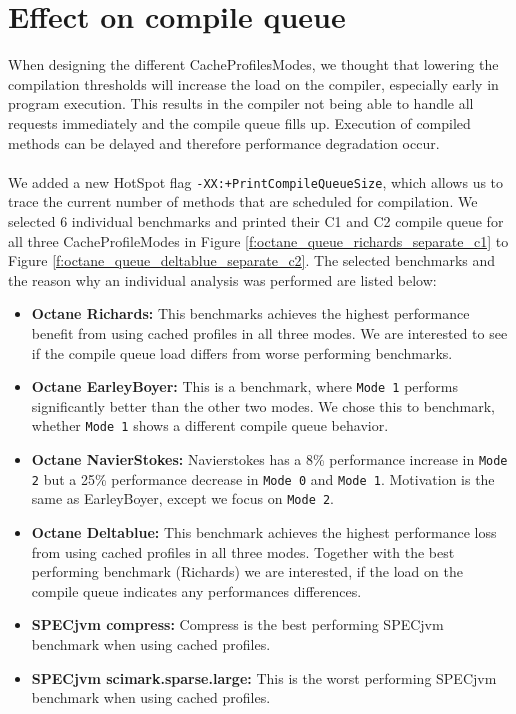 \section{Effect on compile queue}
\label{s:perf_compilequeue}
When designing the different CacheProfilesModes, we thought that lowering the compilation thresholds will increase the load on the compiler, especially early in program execution. This results in the compiler not being able to handle all requests immediately and the compile queue fills up. Execution of compiled methods can be delayed and therefore performance degradation occur.
\\\\
We added a new HotSpot flag \texttt{-XX:+PrintCompileQueueSize}, which allows us to trace the current number of methods that are scheduled for compilation. We selected 6 individual benchmarks and printed their C1 and C2 compile queue for all three CacheProfileModes in Figure \ref{f:octane_queue_richards_separate_c1} to Figure \ref{f:octane_queue_deltablue_separate_c2}.
The selected benchmarks and the reason why an individual analysis was performed are listed below:
\begin{itemize}
  \item \textbf{Octane Richards:} This benchmarks achieves the highest performance benefit from using cached profiles in all three modes. We are interested to see if the compile queue load differs from worse performing benchmarks.
  \item \textbf{Octane EarleyBoyer:} This is a benchmark, where \texttt{Mode 1} performs significantly better than the other two modes. We chose this to benchmark, whether \texttt{Mode 1} shows a different compile queue behavior.
  \item \textbf{Octane NavierStokes:} Navierstokes has a 8\% performance increase in \texttt{Mode 2} but a 25\% performance decrease in \texttt{Mode 0} and \texttt{Mode 1}. Motivation is the same as EarleyBoyer, except we focus on \texttt{Mode 2}.
  \item \textbf{Octane Deltablue:} This benchmark achieves the highest performance loss from using cached profiles in all three modes. Together with the best performing benchmark (Richards) we are interested, if the load on the compile queue indicates any performances differences.
  \item \textbf{SPECjvm compress:} Compress is the best performing SPECjvm benchmark when using cached profiles. 
  \item \textbf{SPECjvm scimark.sparse.large:} This is the worst performing SPECjvm benchmark when using cached profiles. 
\end{itemize}

